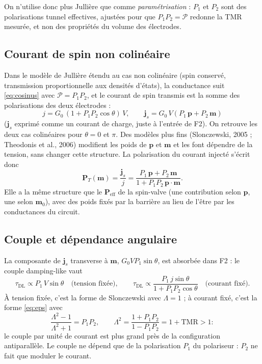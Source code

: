 \documentclass[11pt,a4paper]{article}
\newcommand{\vm}{\bm{m}}
\newcommand{\vp}{\bm{p}}
\begin{document}
On n'utilise donc plus Jullière que comme \emph{paramétrisation} : $P_1$ et
$P_2$ sont des polarisations tunnel effectives, ajustées pour que
$P_1P_2 = \mathcal{P}$ redonne la TMR mesurée, et non des propriétés du
volume des électrodes.

\subsection{Courant de spin non colinéaire}

Dans le modèle de Jullière étendu au cas non colinéaire (spin conservé,
transmission proportionnelle aux densités d'états), la conductance suit
\eqref{eq:cosinus} avec $\mathcal{P} = P_1P_2$, et le courant de spin
transmis est la somme des polarisations des deux électrodes :
\begin{equation}
  \boxed{\;j = G_0\,(1+P_1P_2\cos\theta)\,V,
  \qquad
  \bm{j}_s = G_0\,V\left(P_1\,\vp + P_2\,\vm\right)\;}
  \label{eq:tunnel-js}
\end{equation}
($\bm{j}_s$ exprimé comme un courant de charge, juste à l'entrée de F2).
On retrouve les deux cas colinéaires pour $\theta = 0$ et $\pi$. Des
modèles plus fins (Slonczewski, 2005 ; Theodonis et al., 2006) modifient
les poids de $\vp$ et $\vm$ et les font dépendre de la tension, sans
changer cette structure. La polarisation du courant injecté s'écrit donc
\begin{equation}
  \bm{P}_T(\vm) = \frac{\bm{j}_s}{j}
  = \frac{P_1\,\vp + P_2\,\vm}{1+P_1P_2\,\vp\cdot\vm} .
  \label{eq:PT}
\end{equation}
Elle a la même structure que le $\bm{P}_{\!\mathrm{eff}}$ de la spin-valve
(une contribution selon $\vp$, une selon $\vm_0$), avec des poids fixés
par la barrière au lieu de l'être par les conductances du circuit.

\subsection{Couple et dépendance angulaire}

La composante de $\bm{j}_s$ transverse à $\vm$, $G_0VP_1\sin\theta$, est
absorbée dans F2 : le couple damping-like vaut
\begin{equation}
  \tau_{\mathrm{DL}}\propto P_1\,V\sin\theta
  \quad\text{(tension fixée)},
  \qquad
  \tau_{\mathrm{DL}}\propto \frac{P_1\,j\sin\theta}{1+P_1P_2\cos\theta}
  \quad\text{(courant fixé)}.
\end{equation}
À tension fixée, c'est la forme de Slonczewski avec $\Lambda = 1$ ; à
courant fixé, c'est la forme \eqref{eq:eps} avec
\begin{equation}
  \frac{\Lambda^2-1}{\Lambda^2+1} = P_1P_2,
  \qquad
  \Lambda^2 = \frac{1+P_1P_2}{1-P_1P_2} = 1+\mathrm{TMR} > 1 :
\end{equation}
le couple par unité de courant est plus grand près de la configuration
antiparallèle. Le couple ne dépend que de la polarisation $P_1$ du
polariseur : $P_2$ ne fait que moduler le courant.
\end{document}
